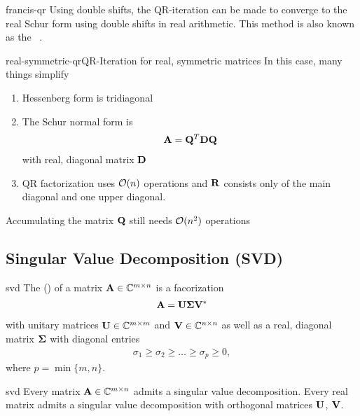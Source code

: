 \begin{Remark}{francis-qr}
  Using double shifts, the QR-iteration can be made to converge to the
  real Schur form using double shifts in real arithmetic. This method
  is also known as the ~\cite[Algorithm
  7.5-1]{GolubVanLoan83}.
\end{Remark}

\begin{Remark*}{real-symmetric-qr}{QR-Iteration for real, symmetric matrices}
  In this case, many things simplify
  \begin{enumerate}
  \item Hessenberg form is tridiagonal
  \item The Schur normal form is
    \begin{gather}
      \mathbf A = \mathbf Q^T\mathbf D\mathbf Q
    \end{gather}
    with real, diagonal matrix $\mathbf D$
  \item QR factorization uses $\mathcal O(n)$ operations and $\mathbf R$
    consists only of the main diagonal and one upper diagonal.
  \end{enumerate}
  Accumulating the matrix $\mathbf Q$ still needs $\mathcal O(n^2)$ operations
\end{Remark*}

\subsection{Singular Value Decomposition (SVD)}

\begin{Definition}{svd}
  The  () of a matrix $\mathbf A\in\mathbb C^{m\times n}$ is a facorization
  \begin{gather}
    \mathbf A = \mathbf U\boldsymbol\Sigma\mathbf V^*
  \end{gather}
  with unitary matrices $\mathbf U\in\mathbb C^{m\times m}$ and $\mathbf V\in\mathbb C^{n\times n}$ as
  well as a real, diagonal matrix $\boldsymbol\Sigma$ with diagonal entries
  \begin{gather}
    \sigma_1 \ge \sigma_2 \ge \dots \ge \sigma_p \ge 0,
  \end{gather}
  where $p = \min\{m,n\}$.
\end{Definition}

\begin{Theorem}{svd}
  Every matrix $\mathbf A\in\mathbb C^{m\times n}$ admits a singular value
  decomposition. Every real matrix admits a singular value
  decomposition with orthogonal matrices $\mathbf U$, $\mathbf V$.
\end{Theorem}

